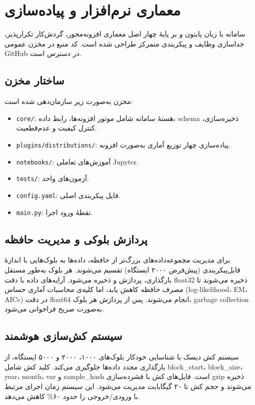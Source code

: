 \documentclass[12pt,a4paper,twocolumn]{article}
\begin{document}
\section{معماری نرم‌افزار و پیاده‌سازی}

سامانه با زبان پایتون و بر پایهٔ چهار اصل معماری افزونه‌محور، گردش‌کار تکرارپذیر، جداسازی وظایف و پیکربندی متمرکز طراحی شده است. کد منبع در مخزن عمومی GitHub \cite{github} در دسترس است.

\subsection{ساختار مخزن}
مخزن به‌صورت زیر سازمان‌دهی شده است:
\begin{itemize}
\item \texttt{core/}: هستهٔ سامانه شامل موتور افزونه‌ها، رابط داده، schema ذخیره‌سازی، کنترل کیفیت و عدم‌قطعیت.
\item \texttt{plugins/distributions/}: پیاده‌سازی چهار توزیع آماری به‌صورت افزونه.
\item \texttt{notebooks/}: آموزش‌های تعاملی Jupyter.
\item \texttt{tests/}: آزمون‌های واحد.
\item \texttt{config.yaml}: فایل پیکربندی اصلی.
\item \texttt{main.py}: نقطهٔ ورود اجرا.
\end{itemize}

\subsection{پردازش بلوکی و مدیریت حافظه}
برای مدیریت مجموعه‌داده‌های بزرگ‌تر از حافظه، داده‌ها به بلوک‌هایی با اندازهٔ قابل‌پیکربندی (پیش‌فرض ۲۰۰۰ ایستگاه) تقسیم می‌شوند. هر بلوک به‌طور مستقل بارگذاری، پردازش و ذخیره می‌شود. آرایه‌های داده با دقت float32 ذخیره می‌شوند تا مصرف حافظه کاهش یابد، اما کلیه‌ی محاسبات آماری حساس (log-likelihood، EM، AICc) در دقت float64 انجام می‌شوند. پس از پردازش هر بلوک، garbage collection به‌صورت صریح فراخوانی می‌شود.

\subsection{سیستم کش‌سازی هوشمند}
سیستم کش دیسک با شناسایی خودکار بلوک‌های ۱۰۰۰، ۲۰۰۰ و ۵۰۰۰ ایستگاه، از بارگذاری مجدد داده‌ها جلوگیری می‌کند. کلید کش شامل block\_start، block\_size، year، month، var و sample\_hash است. فایل‌های کش با فشرده‌سازی gzip ذخیره می‌شوند و حجم کش تا ۲۰ گیگابایت مدیریت می‌شود. این سیستم زمان اجرای مرتبط با ورودی/خروجی را حدود ۶۰\% کاهش می‌دهد.
\end{document}
